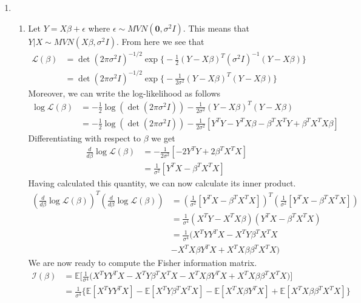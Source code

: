 \documentclass[12pt]{article}  %
\newcommand{\e}{{\epsilon}}
\newcommand{\E}{{\mathbb{E}}}
\begin{document}
\begin{enumerate}
\item 
\begin{enumerate}

\item Let $Y = X\beta + \e$ where $\e\sim MVN(\mathbf{0}, \sigma^2I)$. This means that $Y|X\sim MVN(X\beta,\sigma^2I)$. From here we see that 
\begin{align*}
\mathcal{L}(\beta) &= \det(2\pi\sigma^2I)^{-1/2}\exp\big\{-\frac{1}{2}(Y-X\beta)^{T}(\sigma^2I)^{-1}(Y-X\beta)\big\}\\
&= \det(2\pi\sigma^2I)^{-1/2}\exp\big\{-\frac{1}{2\sigma^2}(Y-X\beta)^{T}(Y-X\beta)\big\}
\end{align*}
Moreover, we can write the log-likelihood as follows 
\begin{align*}
\log\mathcal{L}(\beta) &= -\frac{1}{2}\log(\det(2\pi\sigma^2I)) - \frac{1}{2\sigma^2}(Y-X\beta)^{T}(Y-X\beta)\\
&= -\frac{1}{2}\log(\det(2\pi\sigma^2I)) - \frac{1}{2\sigma^2}\left[Y^TY - Y^TX\beta - \beta^TX^TY + \beta^TX^TX\beta\right]
\end{align*}
Differentiating with respect to $\beta$ we get 
\begin{align*}
\frac{d}{d\beta}\log\mathcal{L}(\beta) &= -\frac{1}{2\sigma^2}\left[-2Y^TY + 2\beta^TX^TX\right]\\
&= \frac{1}{\sigma^2}\left[Y^TX - \beta^TX^TX\right]
\end{align*}
Having calculated this quantity, we can now calculate its inner product.
\begin{align*}
\left(\frac{d}{d\beta}\log\mathcal{L}(\beta)\right)^T\left(\frac{d}{d\beta}\log\mathcal{L}(\beta)\right) & = \left(\frac{1}{\sigma^2}\left[Y^TX - \beta^TX^TX\right]\right)^T\left(\frac{1}{\sigma^2}\left[Y^TX - \beta^TX^TX\right]\right)\\
&= \frac{1}{\sigma^4}\left(X^TY - X^TX\beta\right)\left(Y^TX - \beta^TX^TX\right)\\
&= \frac{1}{\sigma^4}\big(X^TYY^TX - X^TY\beta^TX^TX\\& - X^TX\beta Y^TX + X^TX\beta\beta^TX^TX\big)
\end{align*}
We are now ready to compute the Fisher information matrix. 
\begin{align*}
\mathcal{I}(\beta) &= \E\Big[\frac{1}{\sigma^4}\big(X^TYY^TX - X^TY\beta^TX^TX - X^TX\beta Y^TX + X^TX\beta\beta^TX^TX\big)\Big]\\
& = \frac{1}{\sigma^4}\Big\{\E[X^TYY^TX] - \E[X^TY\beta^TX^TX] - \E[X^TX\beta Y^TX] + \E[X^TX\beta\beta^TX^TX]\Big\}\\

\end{align*}
\end{enumerate}
\end{enumerate}
\end{document}
